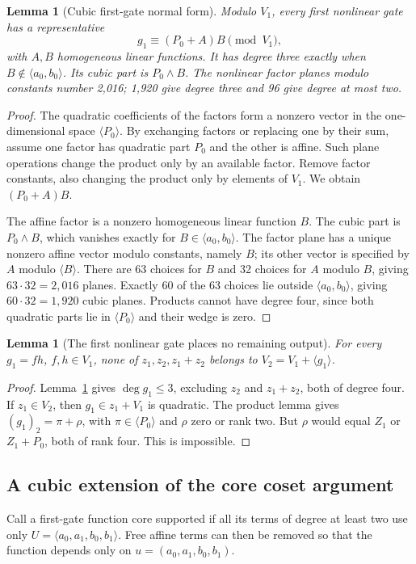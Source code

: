 \documentclass[11pt,a4paper]{article}
\theoremstyle{plain}
\newtheorem{lemma}[theorem]{Lemma}
\theoremstyle{remark}
\begin{document}
\begin{lemma}[Cubic first-gate normal form]\label{l1:lem:cubic}
Modulo $V_1$, every first nonlinear gate has a representative
\[
g_1\equiv(P_0+A)B\pmod{V_1},
\]
with $A,B$ homogeneous linear functions. It has degree three exactly when $B\notin\langle a_0,b_0\rangle$. Its cubic part is $P_0\wedge B$. The nonlinear factor planes modulo constants number 2,016; 1,920 give degree three and 96 give degree at most two.
\end{lemma}
\begin{proof}
The quadratic coefficients of the factors form a nonzero vector in the one-dimensional space $\langle P_0\rangle$. By exchanging factors or replacing one by their sum, assume one factor has quadratic part $P_0$ and the other is affine. Such plane operations change the product only by an available factor. Remove factor constants, also changing the product only by elements of $V_1$. We obtain $(P_0+A)B$.

The affine factor is a nonzero homogeneous linear function $B$. The cubic part is $P_0\wedge B$, which vanishes exactly for $B\in\langle a_0,b_0\rangle$. The factor plane has a unique nonzero affine vector modulo constants, namely $B$; its other vector is specified by $A$ modulo $\langle B\rangle$. There are 63 choices for $B$ and 32 choices for $A$ modulo $B$, giving $63\cdot32=2,016$ planes. Exactly 60 of the 63 choices lie outside $\langle a_0,b_0\rangle$, giving $60\cdot32=1,920$ cubic planes. Products cannot have degree four, since both quadratic parts lie in $\langle P_0\rangle$ and their wedge is zero.
\end{proof}

\begin{lemma}[The first nonlinear gate places no remaining output]\label{l1:lem:first}
For every $g_1=fh$, $f,h\in V_1$, none of $z_1,z_2,z_1+z_2$ belongs to $V_2=V_1+\langle g_1\rangle$.
\end{lemma}
\begin{proof}
Lemma~\ref{l1:lem:cubic} gives $\deg g_1\le3$, excluding $z_2$ and $z_1+z_2$, both of degree four. If $z_1\in V_2$, then $g_1\in z_1+V_1$ is quadratic. The product lemma gives $(g_1)_2=\pi+\rho$, with $\pi\in\langle P_0\rangle$ and $\rho$ zero or rank two. But $\rho$ would equal $Z_1$ or $Z_1+P_0$, both of rank four. This is impossible.
\end{proof}

\subsection{A cubic extension of the core coset argument}
Call a first-gate function core supported if all its terms of degree at least two use only $U=\langle a_0,a_1,b_0,b_1\rangle$. Free affine terms can then be removed so that the function depends only on $u=(a_0,a_1,b_0,b_1)$.
\end{document}
